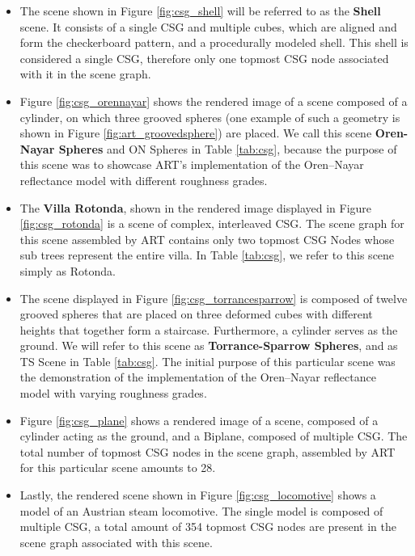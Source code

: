 \begin{itemize}
	\setlength\itemsep{0.05em}
	
	\item The scene shown in Figure \ref{fig:csg_shell} will be referred to as the \textbf{Shell} scene.
	It consists of a single CSG and multiple cubes, which are aligned and form the checkerboard pattern, and a procedurally modeled shell. 
	 This shell is considered a single CSG, therefore only one topmost CSG node associated with it in the scene graph.
	
	
	\item  Figure \ref{fig:csg_orennayar} shows the rendered image of a scene composed of a cylinder, on which three grooved spheres (one example of such a geometry is shown in Figure \ref{fig:art_groovedsphere}) are placed. We call this scene \textbf{Oren-Nayar Spheres} and ON Spheres in Table \ref{tab:csg}, because the purpose of this scene was to showcase ART's implementation of the Oren–Nayar reflectance model \cite{oren1994generalization} with different roughness grades.
	
	\item The \textbf{Villa Rotonda}, shown in the rendered image displayed in Figure \ref{fig:csg_rotonda} is a scene of complex, interleaved CSG. The scene graph for this scene assembled by ART contains only two topmost CSG Nodes whose sub trees represent the entire villa.
	In Table \ref{tab:csg}, we refer to this scene simply as Rotonda.
		
	\item The scene displayed in Figure \ref{fig:csg_torrancesparrow} is composed of twelve grooved spheres that are placed on three deformed cubes with different heights that together form a staircase. Furthermore, a cylinder serves as the ground. We will refer to this scene as \textbf{Torrance-Sparrow Spheres}, and as TS Scene in Table \ref{tab:csg}. The initial purpose of this particular scene was the demonstration of the implementation of the Oren–Nayar reflectance model \cite{torrance1967theory} with varying roughness grades.
	
	\item Figure \ref{fig:csg_plane} shows a rendered image of a scene, composed of a cylinder acting as the ground, and a Biplane, composed of multiple CSG. The total number of topmost CSG nodes in the scene graph, assembled by ART for this particular scene amounts to 28.
	
	\item Lastly, the rendered scene shown in Figure \ref{fig:csg_locomotive} shows a model of an Austrian steam locomotive. The single model is composed of multiple CSG, a total amount of 354 topmost CSG nodes are present in the scene graph associated with this scene.
	
	
\end{itemize}


